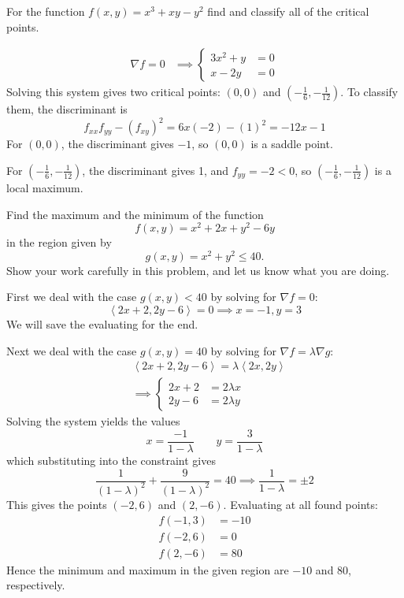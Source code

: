 \documentclass[12pt,answers]{exam}
\newcommand{\vect}[1]{\left\langle #1\right\rangle}
\begin{document}
\begin{questions}
	\newpage
	\question[14]
	For the function $f(x,y) = x^3 + xy - y^2$ find and classify all of the critical points.
	\begin{solution}
		\begin{align*}
			\nabla f = 0
			&\implies
			\left\{
				\begin{aligned}
					3x^2 + y &= 0\\ 
					x - 2y &= 0
				\end{aligned}
			\right.
		\end{align*}
		Solving this system gives two critical points: 
		$(0,0)$ and $(-\frac1{6}, -\frac1{12})$.
		To classify them, the discriminant is
		\[
			f_{xx} f_{yy} - (f_{xy})^2 
			= 6x(-2) - (1)^2 = -12x - 1
		\]
		For $(0,0)$, the discriminant gives $-1$, so $(0,0)$ is a saddle point.

		For $(-\frac16, -\frac1{12})$, the discriminant gives 1, and $f_{yy} = -2 < 0$, so $(-\frac16, -\frac1{12})$ is a local maximum.
	\end{solution}

	\newpage
	\question[20]
	Find the maximum and the minimum of the function
	\[
		f(x,y) = x^2 + 2x + y^2 - 6y
	\]
	in the region given by 
	\[
		g(x,y) = x^2 + y^2 \le 40.
	\]
	Show your work carefully in this problem, and let us know what you are doing.
	\begin{solution}
		First we deal with the case $g(x, y) < 40$ by solving for $\nabla f =0$:
		\[
			\vect{2x+2, 2y-6} = 0 \implies x=-1, y=3
		\]
		We will save the evaluating for the end.

		Next we deal with the case $g(x, y) = 40$ by solving for $\nabla f = \lambda \nabla g$:
		\[
			\begin{aligned}
			&\vect{2x+2, 2y-6} = \lambda \vect{2x, 2y} \\
			& \implies \left\{
				\begin{aligned}
					2x+2 &= 2\lambda x\\
					2y-6 &= 2\lambda y
				\end{aligned}
			\right.
			\end{aligned}
		\]
		Solving the system yields the values
		\[
			x = \frac{-1}{1-\lambda} \qquad y = \frac{3}{1-\lambda}
		\]
		which substituting into the constraint gives
		\[
			\frac{1}{(1-\lambda)^2} + \frac{9}{(1-\lambda)^2} = 40 \implies \frac{1}{1-\lambda} = \pm 2
		\]
		This gives the points $(-2, 6)$ and $(2, -6)$.
		Evaluating at all found points:
		\begin{align*}
			f(-1, 3) &= -10\\ 
			f(-2, 6) &= 0\\
			f(2, -6) &= 80 
		\end{align*}
		Hence the minimum and maximum in the given region are $-10$ and 80, respectively.
	\end{solution}


\end{questions}
\end{document}
